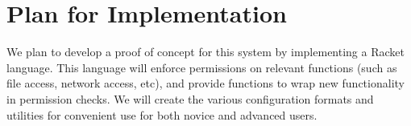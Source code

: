 \documentclass[12pt,letterpaper]{article}
\begin{document}
\section*{Plan for Implementation}

We plan to develop a proof of concept for this system by implementing a Racket
language.  This language will enforce permissions on relevant functions (such as
file access, network access, etc), and provide functions to wrap new functionality 
in permission checks.  We will create the various configuration formats and utilities
for convenient use for both novice and advanced users. 
\end{document}
